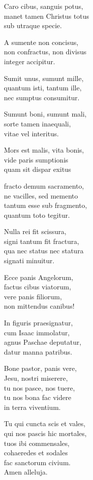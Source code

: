 \documentclass[parskip=full]{scrreprt}
\DeclareRobustCommand{\ltseries}{\fontseries{lt}\selectfont}
\newif\iftemplate\templatetrue
\begin{document}
\begin{multicols}{3}[\ltseries]
Caro cibus, sanguis potus,\\
manet tamen Christus totus\\
sub utraque specie.

A sumente non concisus,\\
non confractus, non divisus\\
integer accipitur.

Sumit unus, sumunt mille,\\
quantum isti, tantum ille,\\
nec sumptus consumitur.

Sumunt boni, sumunt mali,\\
sorte tamen inaequali,\\
vitae vel interitus.

Mors est malis, vita bonis,\\
vide paris sumptionis\\
quam sit dispar exitus

fracto demum sacramento,\\
ne vacilles, sed memento\\
tantum esse sub fragmento,\\
quantum toto tegitur.

Nulla rei fit scissura,\\
signi tantum fit fractura,\\
qua nec status nec statura\\
signati minuitur.

Ecce panis Angelorum,\\
factus cibus viatorum,\\
vere panis filiorum,\\
non mittendus canibus!

In figuris praesignatur,\\
cum Isaac immolatur,\\
agnus Paschae deputatur,\\
datur manna patribus.

Bone pastor, panis vere,\\
Jesu, nostri miserere,\\
tu nos pasce, nos tuere,\\
tu nos bona fac videre\\
in terra viventium.

Tu qui cuncta scis et vales,\\
qui nos pascis hic mortales,\\
tuos ibi commensales,\\
cohaeredes et sodales\\
fac sanctorum civium.\\
Amen alleluja.
\end{multicols}


\cleardoublepage
\fi

\iftemplate

\fi
\end{document}
